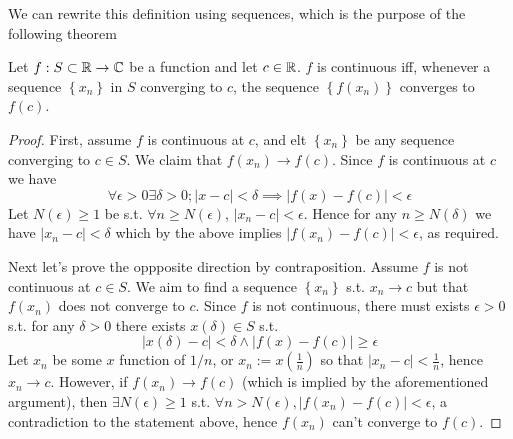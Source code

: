 We can rewrite this definition using sequences, which is the purpose of the following
theorem
\begin{theorem} 
  Let $f:S\subset\mathbb R\to\mathbb C$ be a function and let $c\in\mathbb R$. $f$ is continuous iff, whenever a
  sequence $\left\{ x_n \right\}$ in $S$ converging to $c$, the sequence $\left\{ f(x_n)
  \right\}$ converges to $f(c)$.
\end{theorem}
\begin{proof}
  First, assume $f$ is continuous at $c$, and elt $\left\{ x_n \right\}$ be any sequence
  converging to $c\in S$. We claim that $f(x_n)\to f(c)$. Since $f$ is continuous at $c$
  we have
  \[ \forall\epsilon>0\exists\delta>0 ; |x-c|<\delta \implies |f(x)-f(c)|<\epsilon\]
  Let $N(\epsilon)\geq 1$ be s.t. $\forall n\geq N(\epsilon)$, $|x_n-c|<\epsilon$. Hence
  for any $n\geq N(\delta)$ we have $|x_n-c|<\delta$ which by the above implies
  $|f(x_n)-f(c)|<\epsilon$, as required.

  Next let's prove the oppposite direction by contraposition. Assume $f$ is not
  continuous at $c\in S$. We aim to find a sequence $\left\{ x_n \right\}$ s.t. $x_n\to c$
  but that $f(x_n)$ does not converge to $c$. Since $f$ is not continuous, there must
  exists $\epsilon>0$ s.t. for any $\delta>0$ there exists $x(\delta)\in S$ s.t. 
  \[|x(\delta)-c|<\delta \land |f(x)-f(c)|\geq \epsilon\]
  Let $x_n$ be some $x$ function of $1/n$, or $x_n:=x(\frac{1}{n})$ so that
  $|x_n-c|<\frac{1}{n}$, hence $x_n\to c$. However, if $f(x_n)\to f(c)$ (which is implied
  by the aforementioned argument), then $\exists N(\epsilon)\geq 1$ s.t. $\forall
  n>N(\epsilon), |f(x_n)-f(c)|<\epsilon$, a contradiction to the statement above, hence
  $f(x_n)$ can't converge to $f(c)$.
\end{proof}

